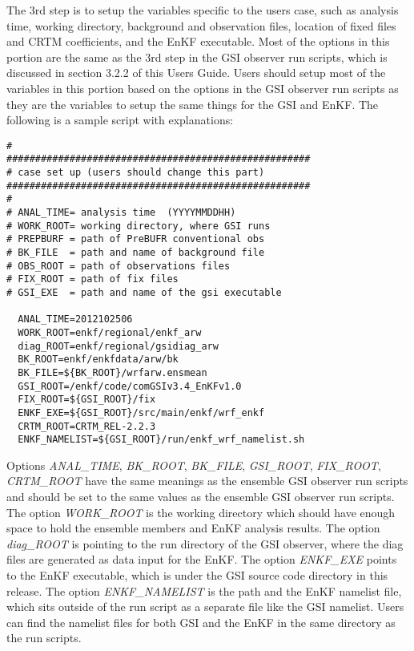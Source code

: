 The 3rd step is to setup the variables specific to the user\textquotesingle s case, such as analysis time, working directory, background and observation files, location of fixed files and CRTM coefficients, and the EnKF executable. Most of the options in this portion are the same as the 3rd step in the GSI observer run scripts, which is discussed in section 3.2.2 of this User\textquotesingle s Guide. Users should setup most of the variables in this portion based on the options in the GSI observer run scripts as they are the variables to setup the same things for the GSI and EnKF. The following is a sample script with explanations:
\begin{scriptsize}
\begin{verbatim}
#
#####################################################
# case set up (users should change this part)
#####################################################
#
# ANAL_TIME= analysis time  (YYYYMMDDHH)
# WORK_ROOT= working directory, where GSI runs
# PREPBURF = path of PreBUFR conventional obs
# BK_FILE  = path and name of background file
# OBS_ROOT = path of observations files
# FIX_ROOT = path of fix files
# GSI_EXE  = path and name of the gsi executable

  ANAL_TIME=2012102506
  WORK_ROOT=enkf/regional/enkf_arw
  diag_ROOT=enkf/regional/gsidiag_arw
  BK_ROOT=enkf/enkfdata/arw/bk
  BK_FILE=${BK_ROOT}/wrfarw.ensmean
  GSI_ROOT=/enkf/code/comGSIv3.4_EnKFv1.0
  FIX_ROOT=${GSI_ROOT}/fix
  ENKF_EXE=${GSI_ROOT}/src/main/enkf/wrf_enkf
  CRTM_ROOT=CRTM_REL-2.2.3
  ENKF_NAMELIST=${GSI_ROOT}/run/enkf_wrf_namelist.sh
\end{verbatim}
\end{scriptsize}

Options \textit{ANAL\_TIME}, \textit{BK\_ROOT}, \textit{BK\_FILE}, \textit{GSI\_ROOT}, \textit{FIX\_ROOT}, \textit{CRTM\_ROOT} have 
the same meanings as the ensemble GSI observer run scripts and should be set to the 
same values as the ensemble GSI observer run scripts. The option \textit{WORK\_ROOT} is 
the working directory which should have enough space to hold the ensemble members 
and EnKF analysis results. The option \textit{diag\_ROOT} is pointing to the run directory of the 
GSI observer, where the diag files are generated as data input for the EnKF. The option 
\textit{ENKF\_EXE} points to the EnKF executable, which is under the GSI source code directory 
in this release. The option \textit{ENKF\_NAMELIST} is the path and the EnKF namelist file, which 
sits outside of the run script as a separate file like the GSI namelist. Users can find the 
namelist files for both GSI and the EnKF in the same directory as the run scripts.

